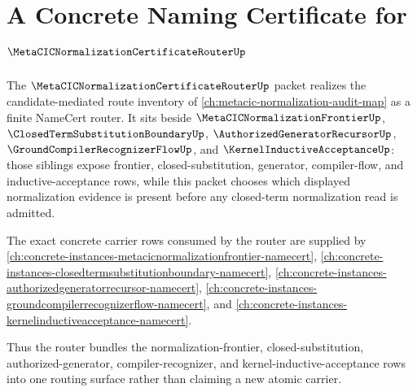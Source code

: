 \chapter{A Concrete Naming Certificate for $\MetaCICNormalizationCertificateRouterUp$}
\label{ch:concrete-instances-metacicnormalizationcertificaterouter-namecert}

The $\MetaCICNormalizationCertificateRouterUp$ packet realizes the candidate-mediated route inventory of \autoref{ch:metacic-normalization-audit-map} as a finite NameCert router. It sits beside $\MetaCICNormalizationFrontierUp$, $\ClosedTermSubstitutionBoundaryUp$, $\AuthorizedGeneratorRecursorUp$, $\GroundCompilerRecognizerFlowUp$, and $\KernelInductiveAcceptanceUp$: those siblings expose frontier, closed-substitution, generator, compiler-flow, and inductive-acceptance rows, while this packet chooses which displayed normalization evidence is present before any closed-term normalization read is admitted.

The exact concrete carrier rows consumed by the router are supplied by \autoref{ch:concrete-instances-metacicnormalizationfrontier-namecert}, \autoref{ch:concrete-instances-closedtermsubstitutionboundary-namecert}, \autoref{ch:concrete-instances-authorizedgeneratorrecursor-namecert}, \autoref{ch:concrete-instances-groundcompilerrecognizerflow-namecert}, and \autoref{ch:concrete-instances-kernelinductiveacceptance-namecert}.

Thus the router bundles the normalization-frontier, closed-substitution, authorized-generator, compiler-recognizer, and kernel-inductive-acceptance rows into one routing surface rather than claiming a new atomic carrier.

